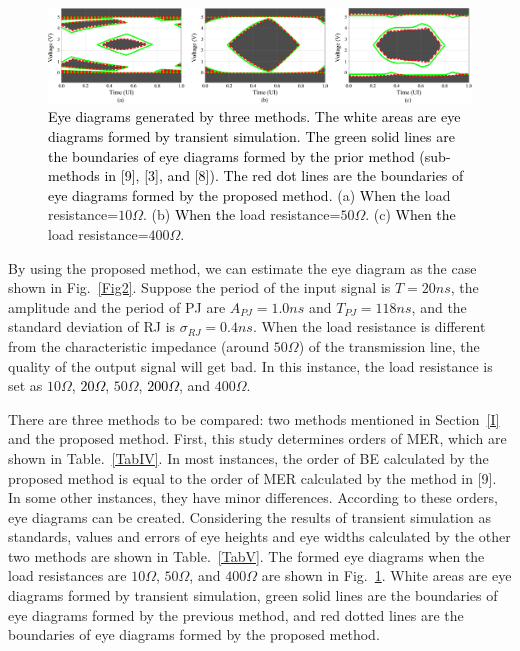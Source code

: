 \documentclass[conference]{IEEEtran}
\begin{document}
\begin{figure}[t]
\centerline{\includegraphics[width=460pt]{Fig13.png}}
\caption{\textcolor{black}{Eye diagrams generated by three methods. The white areas are eye diagrams formed by transient simulation. The green solid lines are the boundaries of eye diagrams formed by the prior method (sub-methods in [9], [3], and [8]). The red dot lines are the boundaries of eye diagrams formed by the proposed method.} (a) \textcolor{black}{When the} load resistance=$10\Omega$. (b) \textcolor{black}{When the} load resistance=$50\Omega$. (c) \textcolor{black}{When the} load resistance=$400\Omega$.}
\label{Fig13}
\end{figure}

By using the proposed method, we can estimate the eye diagram as the case shown in Fig.~\ref{Fig2}. Suppose the period of the input signal is $T=20ns$, the amplitude and the period of PJ are $A_{PJ}=1.0ns$ and $T_{PJ}=118ns$, and the standard deviation of RJ is $\sigma_{RJ}=0.4ns$. When the load resistance is different from the characteristic impedance (around $50\Omega$) of the transmission line, the quality of the output signal will get bad. In this instance, the load resistance is set as $10\Omega$, \textcolor{black}{$20\Omega$}, $50\Omega$, \textcolor{black}{$200\Omega$}, and $400\Omega$.

There are three methods to be compared:
\color{black}
two methods mentioned in Section~\ref{I} and the proposed method. First, this study determines orders of MER, which are shown in Table.~\ref{TabIV}. In most instances, the order of BE calculated by the proposed method is equal to the order of MER calculated by the method in [9]. In some other instances, they have minor differences. According to these orders, eye diagrams can be created. Considering the results of transient simulation as standards, values and errors of eye heights and eye widths calculated by the other two methods are shown in Table.~\ref{TabV}. The formed eye diagrams when the load resistances are $10\Omega$, $50\Omega$, and $400\Omega$ are shown in Fig.~\ref{Fig13}. White areas are eye diagrams formed by transient simulation, green solid lines are the boundaries of eye diagrams formed by the previous method, and red dotted lines are the boundaries of eye diagrams formed by the proposed method.
\end{document}
